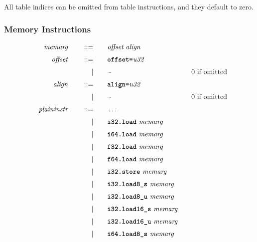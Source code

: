 All table indices can be omitted from table instructions, and they default to zero.

\subsubsection{Memory Instructions}
\begin{alignat*}{9}
    && \textit{memarg}\ &&\quad ::= &\quad && \textit{offset}\ \textit{align} \quad &&  \\[1mm]
    && \textit{offset}\ &&\quad ::= &\quad && \textbf{\texttt{offset=}} \textit{u32} \quad &&  \\[1mm]
    &&       &&\quad | &\quad && \textit{\textasciitilde} \quad && \textrm{0 if omitted} \\[1mm]
    && \textit{align}\ &&\quad ::= &\quad && \textbf{\texttt{align=}} \textit{u32} \quad &&  \\[1mm]
    &&       &&\quad | &\quad && \textit{\textasciitilde} \quad && \textrm{0 if omitted} \\[1mm]
    && \textit{plaininstr}\ &&\quad ::= &\quad && \dots \quad &&  \\[1mm]
    &&       &&\quad | &\quad && \textbf{\texttt{i32.load}}\ \textit{memarg} \quad &&  \\[1mm]
    &&       &&\quad | &\quad && \textbf{\texttt{i64.load}}\ \textit{memarg} \quad &&  \\[1mm]
    &&       &&\quad | &\quad && \textbf{\texttt{f32.load}}\ \textit{memarg} \quad &&  \\[1mm]
    &&       &&\quad | &\quad && \textbf{\texttt{f64.load}}\ \textit{memarg} \quad &&  \\[1mm]
    &&       &&\quad | &\quad && \textbf{\texttt{i32.store}}\ \textit{memarg} \quad &&  \\[1mm]
    &&       &&\quad | &\quad && \textbf{\texttt{i32.load8\textunderscore s}}\ \textit{memarg} \quad &&  \\[1mm]
    &&       &&\quad | &\quad && \textbf{\texttt{i32.load8\textunderscore u}}\ \textit{memarg} \quad &&  \\[1mm]
    &&       &&\quad | &\quad && \textbf{\texttt{i32.load16\textunderscore s}}\ \textit{memarg} \quad &&  \\[1mm]
    &&       &&\quad | &\quad && \textbf{\texttt{i32.load16\textunderscore u}}\ \textit{memarg} \quad &&  \\[1mm]
    &&       &&\quad | &\quad && \textbf{\texttt{i64.load8\textunderscore s}}\ \textit{memarg} \quad &&  \\[1mm]

\end{alignat*}

